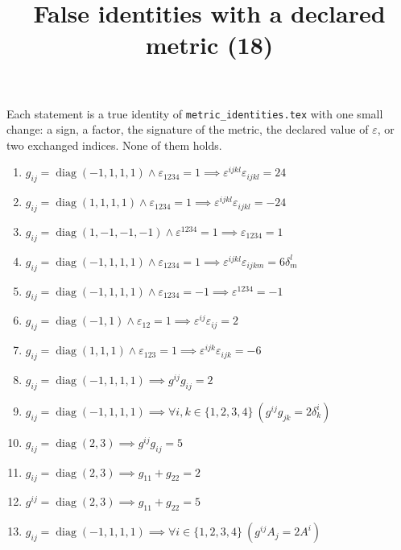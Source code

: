 \documentclass[11pt,a4paper]{article}
\title{False identities with a declared metric (18)}
\author{}
\date{}
\begin{document}
\maketitle
Each statement is a true identity of \texttt{metric\_identities.tex} with one small change: a sign, a factor, the signature of the metric, the declared value of $\varepsilon$, or two exchanged indices. None of them holds.

\begin{enumerate}
\item $\displaystyle g_{ij} = \operatorname{diag}(-1, 1, 1, 1) \land \varepsilon_{1234} = 1 \implies \varepsilon^{ijkl}\varepsilon_{ijkl} = 24$
\item $\displaystyle g_{ij} = \operatorname{diag}(1, 1, 1, 1) \land \varepsilon_{1234} = 1 \implies \varepsilon^{ijkl}\varepsilon_{ijkl} = -24$
\item $\displaystyle g_{ij} = \operatorname{diag}(1, -1, -1, -1) \land \varepsilon^{1234} = 1 \implies \varepsilon_{1234} = 1$
\item $\displaystyle g_{ij} = \operatorname{diag}(-1, 1, 1, 1) \land \varepsilon_{1234} = 1 \implies \varepsilon^{ijkl}\varepsilon_{ijkm} = 6\delta^{l}_{m}$
\item $\displaystyle g_{ij} = \operatorname{diag}(-1, 1, 1, 1) \land \varepsilon_{1234} = -1 \implies \varepsilon^{1234} = -1$
\item $\displaystyle g_{ij} = \operatorname{diag}(-1, 1) \land \varepsilon_{12} = 1 \implies \varepsilon^{ij}\varepsilon_{ij} = 2$
\item $\displaystyle g_{ij} = \operatorname{diag}(1, 1, 1) \land \varepsilon_{123} = 1 \implies \varepsilon^{ijk}\varepsilon_{ijk} = -6$
\item $\displaystyle g_{ij} = \operatorname{diag}(-1, 1, 1, 1) \implies g^{ij} g_{ij} = 2$
\item $\displaystyle g_{ij} = \operatorname{diag}(-1, 1, 1, 1) \implies \forall i, k \in \{1, 2, 3, 4\}\ \left( g^{ij} g_{jk} = 2\delta^{i}_{k} \right)$
\item $\displaystyle g_{ij} = \operatorname{diag}(2, 3) \implies g^{ij} g_{ij} = 5$
\item $\displaystyle g_{ij} = \operatorname{diag}(2, 3) \implies g_{11} + g_{22} = 2$
\item $\displaystyle g^{ij} = \operatorname{diag}(2, 3) \implies g_{11} + g_{22} = 5$
\item $\displaystyle g_{ij} = \operatorname{diag}(-1, 1, 1, 1) \implies \forall i \in \{1, 2, 3, 4\}\ \left( g^{ij} A_{j} = 2 A^{i} \right)$

\end{enumerate}
\end{document}
